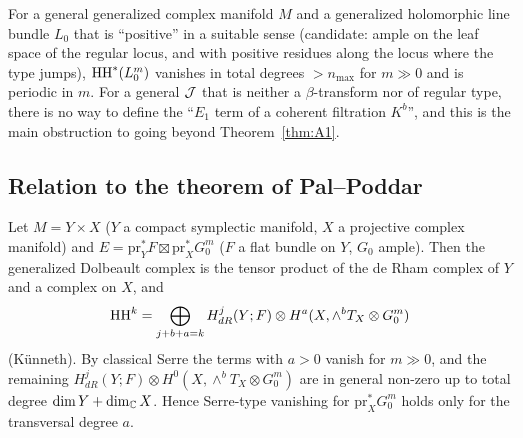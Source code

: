 \begin{conj}\tK\label{conj:A3}
For a general generalized complex manifold $M$ and a generalized holomorphic line bundle $L_0$ that is ``positive'' in a suitable sense (candidate: ample on the leaf space of the regular locus, and with positive residues along the locus where the type jumps), $\mathrm{HH}^*(L_0^m)$ vanishes in total degrees $>n_{\max}$ for $m\gg0$ and is periodic in $m$. For a general $\mathcal J$ that is neither a $\beta$-transform nor of regular type, there is no way to define the ``$E_1$ term of a coherent filtration $K^b$'', and this is the main obstruction to going beyond Theorem~\ref{thm:A1}.
\end{conj}

\subsection{Relation to the theorem of Pal--Poddar}
\begin{prop}\tP\label{prop:PPprod}
Let $M=Y\times X$ ($Y$ a compact symplectic manifold, $X$ a projective complex manifold) and $E=\mathrm{pr}_Y^*F\boxtimes\mathrm{pr}_X^*G_0^m$ ($F$ a flat bundle on $Y$, $G_0$ ample). Then the generalized Dolbeault complex is the tensor product of the de Rham complex of $Y$ and a complex on $X$, and
\[\mathrm{HH}^k=\bigoplus_{j+b+a=k}H^j_{dR}(Y;F)\otimes H^a(X,\wedge^bT_X\otimes G_0^m)\]
(K\"unneth). By classical Serre the terms with $a>0$ vanish for $m\gg0$, and the remaining $H^j_{dR}(Y;F)\otimes H^0(X,\wedge^bT_X\otimes G_0^m)$ are in general non-zero up to total degree $\dim Y+\dim_\mathbb C X$. Hence Serre-type vanishing for $\mathrm{pr}_X^*G_0^m$ holds only for the transversal degree $a$.
\end{prop}
